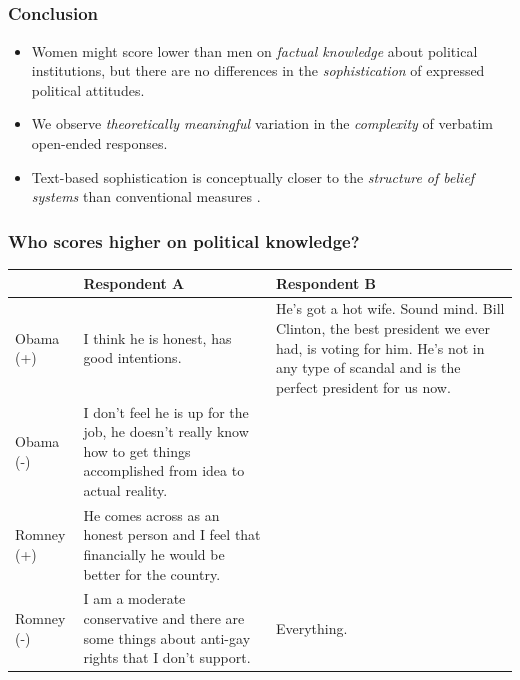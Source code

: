 \documentclass{beamer}
\begin{document}
\subsection{}
\begin{frame}%
  \frametitle{Conclusion}
  \begin{itemize}
\item Women might score lower than men on \emph{factual knowledge} about political institutions, but there are no differences in the \emph{sophistication} of expressed political attitudes.

\hspace{1em}
\item We observe \emph{theoretically meaningful} variation in the \emph{complexity} of verbatim open-ended responses.
\item Text-based sophistication is conceptually closer to the \emph{structure of belief systems} than conventional measures \citep[e.g.,][]{tetlock1983cognitive,luskin1987measuring}.
\end{itemize}
\end{frame}

\begin{frame}%
\frametitle{Who scores higher on political knowledge?}
\begin{table}[ht]\footnotesize\centering
\begin{tabular}{l|p{4.5cm}|p{4.5cm}}
   \toprule
    & \textbf{Respondent A} & \textbf{Respondent B} \\ 
    \midrule
  Obama (+) & I think he is honest, has good intentions. & He's got a hot wife. Sound mind. Bill Clinton, the best president we ever had, is voting for him. He's not in any type of scandal and is the perfect president for us now. \\ \hdashline
  Obama (-) & I don't feel he is up for the job, he doesn't really know how to get things accomplished from idea to actual reality. &  \\ \hdashline
  Romney (+) & He comes across as an honest person and I feel that financially he would be better for the country. &  \\ \hdashline
  Romney (-) & I am a moderate conservative and there are some things about anti-gay rights that I don't support. & Everything. \\
    \bottomrule
 \end{tabular}
\end{table}
\end{frame}
\end{document}
